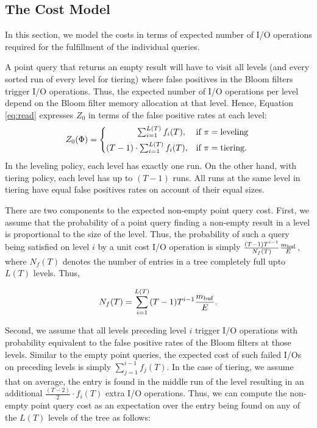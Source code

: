 \subsection{The Cost Model}

In this section, we model the costs in terms of expected number of I/O 
    operations required for the fulfillment of the individual queries.

A point query that returns an empty result will have to visit all levels (and
    every sorted run of every level for tiering) where false positives in the 
    Bloom filters trigger I/O operations. 
Thus, the expected number of I/O operations per level depend on the Bloom filter 
    memory allocation at that level.  
Hence, Equation \eqref{eq:read} expresses $Z_0$ in terms of the false positive 
    rates at each level:
\begin{equation} 
\label{eq:read}
Z_0(\configuration) = 
\begin{cases}
{\color{white} (T-1) \cdot} \sum_{i=1}^{L(T)} f_i(T),	&  \text{if }\policy=\text{leveling} \\[4pt]
(T-1) \cdot \sum_{i=1}^{L(T)} f_i(T) ,	&  \text{if }\policy=\text{tiering}.  \\
\end{cases} \\
\end{equation}
In the leveling policy, each level has exactly one run.  
On the other hand, with tiering policy, each level has up to $(T-1)$ runs.
All runs at the same level in tiering have equal false positives rates 
    on account of their equal sizes. 


There are two components to the expected non-empty point query
    cost.
First, we assume that the probability of a point query finding a non-empty 
    result in a level is proportional to the size of the level. 
Thus, the probability of such a query being satisfied on level $i$ by a unit
    cost I/O operation is simply 
    $\frac{(T-1)T^{i-1}}{N_f(T)}\frac{{{m_{\mathrm{buf}}}}}{E}$, where $N_f(T)$ denotes the 
    number of entries in a tree completely full upto $L(T)$ levels. Thus,

\begin{equation}
N_f(T) = \sum_{i=1}^{L(T)} (T-1)T^{i-1}\frac{{{m_{\mathrm{buf}}}}}{E}. 
\end{equation}

Second, we assume that all levels preceding level $i$ trigger I/O 
    operations with probability equivalent to the false positive rates of the 
    Bloom filters at those levels.
Similar to the empty point queries, the expected cost of such failed
    I/Os on preceding levels is simply $\sum_{j=1}^{i-1}f_j(T)$.
In the case of tiering, we assume that on average, the entry is found in the
    middle run of the level resulting in an additional
    $\frac{(T-2)}{2}\cdot f_i(T)$ extra I/O operations. 
Thus, we can compute the non-empty point query cost as an expectation over the 
    entry being found on any of the $L(T)$ levels of the tree as follows:

